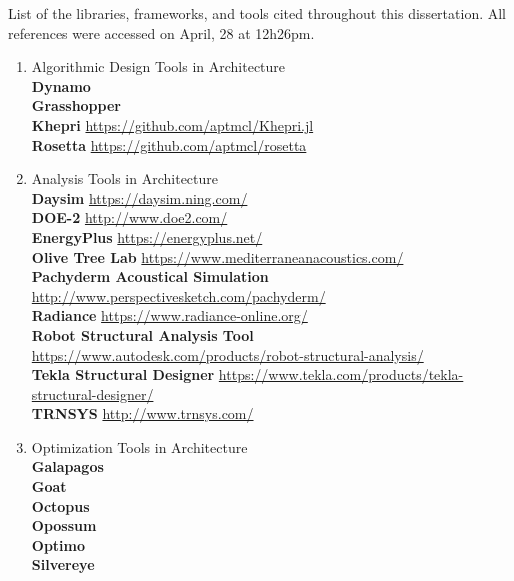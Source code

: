 List of the libraries, frameworks, and tools cited throughout this dissertation. All references were accessed on April, 28 at 12h26pm.
\begin{enumerate}[label=\Alph*]
\item Algorithmic Design Tools in Architecture \\
\textbf{Dynamo} \cite{DYNAMOBIM} \\
\textbf{Grasshopper} \cite{GRASSHOPPER} \\ 
\textbf{Khepri} \url{https://github.com/aptmcl/Khepri.jl} \\
\textbf{Rosetta} \url{https://github.com/aptmcl/rosetta} 

\item Analysis Tools in Architecture \\
\textbf{Daysim} \url{https://daysim.ning.com/} \\
\textbf{DOE-2} \url{http://www.doe2.com/} \\
\textbf{EnergyPlus} \url{https://energyplus.net/} \\
\textbf{Olive Tree Lab} \url{https://www.mediterraneanacoustics.com/} \\
\textbf{Pachyderm Acoustical Simulation} \url{http://www.perspectivesketch.com/pachyderm/} \\
\textbf{Radiance} \url{https://www.radiance-online.org/} \\
\textbf{Robot Structural Analysis Tool} \url{https://www.autodesk.com/products/robot-structural-analysis/} \\
\textbf{Tekla Structural Designer} \url{https://www.tekla.com/products/tekla-structural-designer/} \\
\textbf{TRNSYS} \url{http://www.trnsys.com/} 

\item Optimization Tools in Architecture \\
\textbf{Galapagos} \cite{GALAPAGOS} \\
\textbf{Goat} \cite{GOAT} \\ 
\textbf{Octopus} \cite{OCTOPUS} \\
\textbf{Opossum}  \cite{Wortmann2017Opossum} \\
\textbf{Optimo} \cite{OPTIMO} \\
\textbf{Silvereye} \cite{Cichocka2017SILVEREYE} \\


\end{enumerate}
